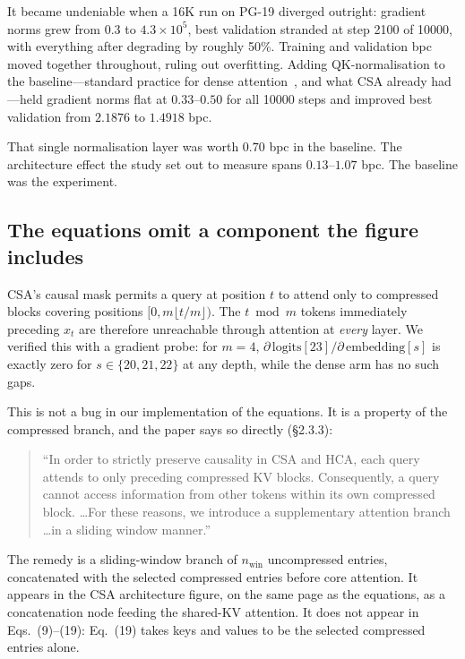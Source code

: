 \documentclass[11pt]{article}
\begin{document}
It became undeniable when a 16K run on PG-19 diverged outright: gradient norms
grew from $0.3$ to $4.3\times10^{5}$, best validation stranded at step 2100 of
10000, with everything after degrading by roughly 50\%. Training and validation
bpc moved together throughout, ruling out overfitting. Adding QK-normalisation
to the baseline---standard practice for dense attention~\cite{henry2020qknorm,
dehghani2023vit22b}, and what CSA already had---held gradient norms flat at
$0.33$--$0.50$ for all 10000 steps and improved best validation from
$2.1876$ to $1.4918$ bpc.

That single normalisation layer was worth $0.70$ bpc in the baseline. The
architecture effect the study set out to measure spans $0.13$--$1.07$ bpc.
The baseline was the experiment.

\subsection{The equations omit a component the figure includes}
\label{sec:recency}

CSA's causal mask permits a query at position $t$ to attend only to compressed
blocks covering positions $[0, m\lfloor t/m \rfloor)$. The $t \bmod m$ tokens
immediately preceding $x_t$ are therefore unreachable through attention at
\emph{every} layer. We verified this with a gradient probe: for $m=4$,
$\partial\,\mathrm{logits}[23] / \partial\,\mathrm{embedding}[s]$ is exactly
zero for $s \in \{20,21,22\}$ at any depth, while the dense arm has no such
gaps.

This is not a bug in our implementation of the equations. It is a property of
the compressed branch, and the paper says so directly (\S2.3.3):

\begin{quote}\small
``In order to strictly preserve causality in CSA and HCA, each query attends to
only preceding compressed KV blocks. Consequently, a query cannot access
information from other tokens within its own compressed block. \dots For these
reasons, we introduce a supplementary attention branch \dots in a sliding
window manner.''
\end{quote}

The remedy is a sliding-window branch of $n_{\text{win}}$ uncompressed entries,
concatenated with the selected compressed entries before core attention. It
appears in the CSA architecture figure, on the same page as the equations, as a
concatenation node feeding the shared-KV attention. It does not appear in
Eqs.~(9)--(19): Eq.~(19) takes keys and values to be the selected compressed
entries alone.
\end{document}
